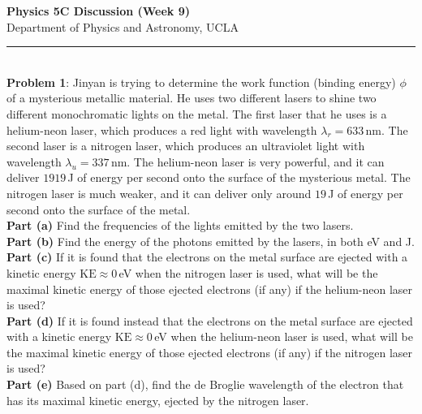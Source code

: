 \documentclass[11pt]{article}
\begin{document}
\Large \noindent \textbf{Physics 5C Discussion (Week 9)}\\
\normalsize
Department of Physics and Astronomy, UCLA\\
\noindent\rule{8cm}{0.4pt}\\
\textbf{Problem 1}:
Jinyan is trying to determine the work function (binding energy) $\phi$ of a mysterious metallic material. He uses two different lasers to shine two different monochromatic lights on the metal. The first laser that he uses is a helium-neon laser, which produces a red light with wavelength $\lambda_{r}=633\,$nm. The second laser is a nitrogen laser, which produces an ultraviolet light with wavelength $\lambda_u = 337\,$nm. The helium-neon laser is very powerful, and it can deliver $1919\,$J of energy per second onto the surface of the mysterious metal. The nitrogen laser is much weaker, and it can deliver only around $19$\,J of energy per second onto the surface of the metal. \\

\noindent\textbf{Part (a)} Find the frequencies of the lights emitted by the two lasers.\\

\noindent\textbf{Part (b)} Find the energy of the photons emitted by the lasers, in both eV and J. \\

\noindent\textbf{Part (c)} If it is found that the electrons on the metal surface are ejected with a kinetic energy $\text{KE}\approx 0$\,eV when the nitrogen laser is used, what will be the maximal kinetic energy of those ejected electrons (if any) if the helium-neon laser is used?\\

\noindent\textbf{Part (d)} If it is found instead that the electrons on the metal surface are ejected with a kinetic energy $\text{KE}\approx 0$\,eV when the helium-neon laser is used, what will be the maximal kinetic energy of those ejected electrons (if any) if the nitrogen laser is used?\\

\noindent\textbf{Part (e)} Based on part (d), find the de Broglie wavelength of the electron that has its maximal kinetic energy, ejected by the nitrogen laser.
\end{document}
